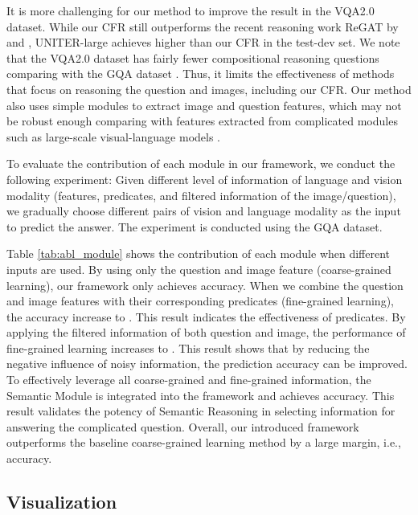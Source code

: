 \documentclass[10pt,twocolumn,letterpaper]{article}
\begin{document}
It is more challenging for our method to improve the result in the VQA2.0 dataset. While our CFR still outperforms the recent reasoning work ReGAT \cite{li2019regat} by  and , UNITER-large \cite{chen2020uniter} achieves  higher than our CFR in the test-dev set. We note that the VQA2.0 dataset has fairly fewer compositional reasoning questions comparing with the GQA dataset \cite{hudson2019gqa}. Thus, it limits the effectiveness of methods that focus on reasoning the question and images, including our CFR. Our method also uses simple modules to extract image and question features, which may not be robust enough comparing with features extracted from complicated modules such as large-scale visual-language models \cite{li2020oscar} \cite{chen2020uniter}.




To evaluate the contribution of each module in our framework, we conduct the following experiment: Given different level of information of language and vision modality (features, predicates, and filtered information of the image/question), we gradually choose different pairs of vision and language modality as the input to predict the answer. The experiment is conducted using the GQA dataset.


Table \ref{tab:abl_module} shows the contribution of each module when different inputs are used. By using only the question and image feature (coarse-grained learning), our framework only achieves  accuracy. When we combine the question and image features with their corresponding predicates (fine-grained learning), the accuracy increase to . This result indicates the effectiveness of predicates. By applying the filtered information of both question and image, the performance of fine-grained learning increases to . This result shows that by reducing the negative influence of noisy information, the prediction accuracy can be improved. To effectively leverage all coarse-grained and fine-grained information, the Semantic Module is integrated into the framework and achieves  accuracy. This result validates the potency of Semantic Reasoning in selecting information for answering the complicated question. Overall, our introduced framework outperforms the baseline coarse-grained learning method by a large margin, i.e.,  accuracy.






\subsection{Visualization} 
\end{document}
